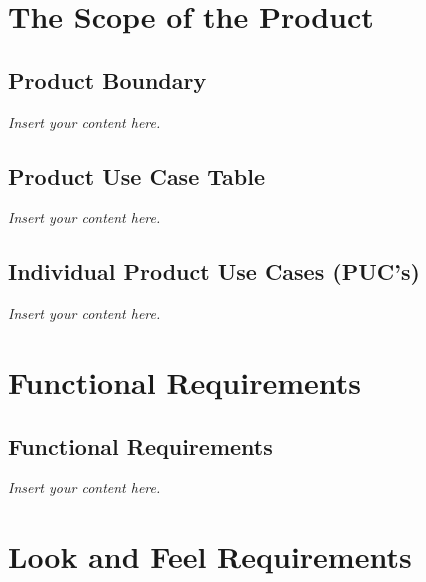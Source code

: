 \documentclass[12pt]{article}
\newcommand{\lips}{\textit{Insert your content here.}}
\begin{document}
\section{The Scope of the Product}
\subsection{Product Boundary}
\lips
\subsection{Product Use Case Table}
\lips
\subsection{Individual Product Use Cases (PUC's)}
\lips
\section{Functional Requirements}
\subsection{Functional Requirements}
\lips

\section{Look and Feel Requirements}
\end{document}

